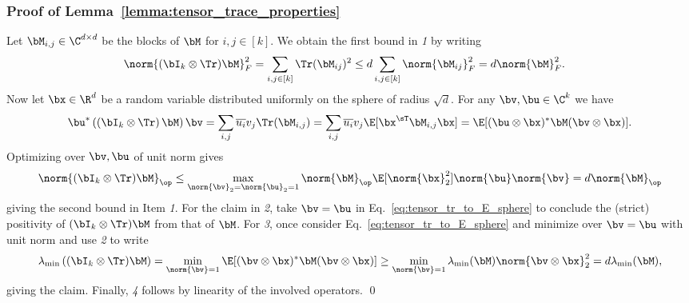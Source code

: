 \subsubsection{Proof of Lemma~\ref{lemma:tensor_trace_properties}}
\label{sec:proof_lemma_tensor_trace_properties}
Let $\bM_{i,j}\in\C^{d\times d}$ be the blocks of $\bM$ for $i,j \in[k]$.
We obtain the first bound in \textit{1} by writing
\begin{align}
\nonumber
    \norm{(\bI_k \otimes \Tr)\bM}_F^2
    &= \sum_{i,j \in[k]} \Tr(\bM_{ij})^2
    \le d \sum_{i,j\in[k]} \norm{\bM_{ij}}_F^2
    = d \norm{\bM}_F^2.
\end{align}
Now let $\bx\in\R^{d}$ be a random variable distributed uniformly on the sphere of radius $\sqrt{d}$.
For any $\bv,\bu \in \C^{k}$ we have
\begin{equation}
\label{eq:tensor_tr_to_E_sphere}
    \bu^* \left(\left(\bI_k \otimes \Tr\right)\bM \right)\bv 
   = \sum_{i,j} \overline{u_i} v_j \Tr(\bM_{i,j}) 
  =  \sum_{i,j} \overline{u_i} v_j \E[\bx^\sT\bM_{i,j} \bx] = \E[(\bu\otimes \bx)^* \bM (\bv\otimes \bx)].
\end{equation}
Optimizing over $\bv,\bu$ of unit norm gives
\begin{align}
\nonumber
   \norm{(\bI_k \otimes \Tr)\bM}_\op  
    \le 
\max_{\norm{\bv}_2 = \norm{\bu}_2 = 1}\norm{\bM}_\op  \E[\norm{\bx}_2^2] \norm{\bu}\norm{\bv}
 = d \norm{\bM}_\op
\end{align}
giving the second bound in Item \textit{1}.
%
For the claim in \textit{2},
take $\bv = \bu$ in Eq.~\eqref{eq:tensor_tr_to_E_sphere} to conclude the (strict) positivity of $(\bI_k\otimes \Tr)\bM$ from that of $\bM$.
For \textit{3}, once consider Eq.~\eqref{eq:tensor_tr_to_E_sphere} and minimize over $\bv = \bu$ with unit norm and use \textit{2} to write
\begin{align}
\nonumber
   \lambda_{\min}\left((\bI_k \otimes \Tr)\bM\right)
   = \min_{\norm{\bv} = 1} \E[(\bv \otimes \bx)^* \bM (\bv \otimes \bx)]
   \ge \min_{\norm{\bv} = 1} \lambda_{\min}(\bM) \norm{\bv \otimes \bx}_2^2
    = d \lambda_{\min}(\bM),
\end{align}
giving the claim.
Finally, \textit{4} follows by linearity of the involved operators.
\qed
